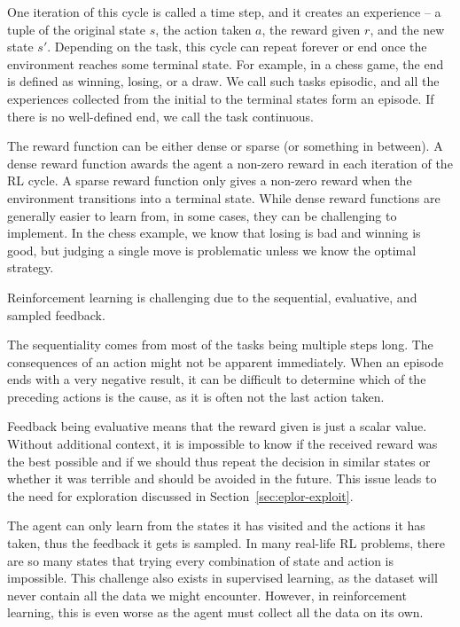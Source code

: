 \documentclass[
  digital,     %
  oneside,     %
  nosansbold,  %
  nocolorbold, %
  lof,         %
  lot,         %
]{fithesis4}
\begin{document}
One iteration of this cycle is called a time step, and it creates an experience -- a tuple of the original state $s$, the action taken $a$, the reward given $r$, and the new state $s'$. Depending on the task, this cycle can repeat forever or end once the environment reaches some terminal state. For example, in a chess game, the end is defined as winning, losing, or a draw. We call such tasks episodic, and all the experiences collected from the initial to the terminal states form an episode. If there is no well-defined end, we call the task continuous.

The reward function can be either dense or sparse (or something in between). A dense reward function awards the agent a non-zero reward in each iteration of the RL cycle. A sparse reward function only gives a non-zero reward when the environment transitions into a terminal state. While dense reward functions are generally easier to learn from, in some cases, they can be challenging to implement. In the chess example, we know that losing is bad and winning is good, but judging a single move is problematic unless we know the optimal strategy.

Reinforcement learning is challenging due to the sequential, evaluative, and sampled feedback.

The sequentiality comes from most of the tasks being multiple steps long. The consequences of an action might not be apparent immediately. When an episode ends with a very negative result, it can be difficult to determine which of the preceding actions is the cause, as it is often not the last action taken.

Feedback being evaluative means that the reward given is just a scalar value. Without additional context, it is impossible to know if the received reward was the best possible and if we should thus repeat the decision in similar states or whether it was terrible and should be avoided in the future. This issue leads to the need for exploration discussed in Section~\ref{sec:eplor-exploit}.

The agent can only learn from the states it has visited and the actions it has taken, thus the feedback it gets is sampled. In many real-life RL problems, there are so many states that trying every combination of state and action is impossible. This challenge also exists in supervised learning, as the dataset will never contain all the data we might encounter. However, in reinforcement learning, this is even worse as the agent must collect all the data on its own.
\end{document}

